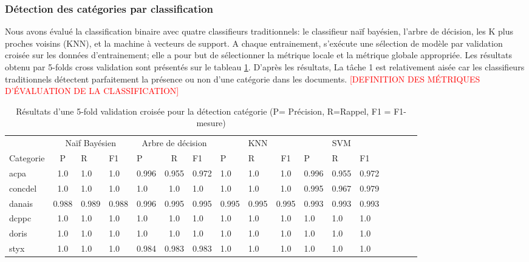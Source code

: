 \subsubsection{Détection des catégories par classification}

Nous avons évalué la classification binaire avec quatre classifieurs traditionnels: le classifieur naïf bayésien, l'arbre de décision, les K plus proches voisins (KNN), et la machine à vecteurs de support. A chaque entrainement, s'exécute une sélection de modèle par validation croisée sur les données d'entrainement; elle a pour but de sélectionner la métrique locale et la métrique globale appropriée. Les résultats obtenu par 5-folds cross validation sont présentés sur le tableau \ref{tab:quanta:resultat-detect-cat}.  D'après les résultats, La tâche 1 est relativement aisée car les classifieurs traditionnels détectent parfaitement la présence ou non d'une catégorie dans les documents. \textcolor{red}{[DEFINITION DES MÉTRIQUES D'ÉVALUATION DE LA CLASSIFICATION]}

\begin{table}[!h]
	\scriptsize
	\centering
	\begin{tabular}{l|c@{\hskip 0.1in}lllc@{\hskip 0.1in}lllc@{\hskip 0.1in}lllc@{\hskip 0.1in}lll}
		\hline\noalign{\smallskip}
		&   \multicolumn{3}{c}{Naïf Bayésien}    &    \multicolumn{3}{c}{Arbre de décision}   &  \multicolumn{3}{c}{KNN}  & \multicolumn{3}{c}{SVM}     \\       
		\noalign{\smallskip}
		\hline
		\noalign{\smallskip}
		Categorie  & P     & R     & F1    & P     & R     & F1    & P     & R     & F1    & P     & R     & F1    \\        
		\noalign{\smallskip}
		\hline
		\noalign{\smallskip}
		acpa    & 1.0 & 1.0 & 1.0 & 0.996 & 0.955 & 0.972 & 1.0 & 1.0 & 1.0 & 0.996 & 0.955 & 0.972 \\
		concdel & 1.0 & 1.0 & 1.0 & 1.0 & 1.0 & 1.0 & 1.0 & 1.0 & 1.0 & 0.995 & 0.967 & 0.979 \\
		danais  & 0.988 & 0.989 & 0.988 & 0.996 & 0.995 & 0.995 & 0.995 & 0.995 & 0.995 & 0.993 & 0.993 & 0.993 \\
		dcppc   & 1.0 & 1.0 & 1.0 & 1.0 & 1.0 & 1.0 & 1.0 & 1.0 & 1.0 & 1.0 & 1.0 & 1.0 \\
		doris   & 1.0 & 1.0 & 1.0 & 1.0 & 1.0 & 1.0 & 1.0 & 1.0 & 1.0 & 1.0 & 1.0 & 1.0 \\
		styx    & 1.0 & 1.0 & 1.0 & 0.984 & 0.983 & 0.983 & 1.0 & 1.0 & 1.0 & 1.0 & 1.0 & 1.0 \\
		\hline
	\end{tabular}
	\caption{Résultats d'une 5-fold validation croisée pour la détection catégorie  (P= Précision, R=Rappel, F1 = F1-mesure)}\label{tab:quanta:resultat-detect-cat}
\end{table}

